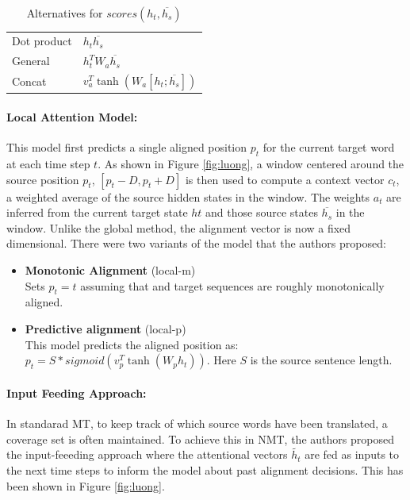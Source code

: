\documentclass{article}
\begin{document}
	 \begin{table}
	 \caption{Alternatives for \(scores(h_t,\overline{h_s})\)}
	  \centering
	  \begin{tabular}{ll}
	  	\toprule
	    Dot product & \(h_t\overline{h_s}\) \\
	    General     & \(h_t^TW_a\overline{h_s}\) \\
	    Concat     & \(v_a^T\tanh(W_a[h_t;\overline{h_s}])\) \\
	    \bottomrule
	  \end{tabular}
	  \label{tab:scores}
	\end{table}

	\paragraph{Local Attention Model: } This model first predicts a single aligned position \(p_t\) for the current target word at each time step \(t\). As shown in Figure \ref{fig:luong}, a window centered around the source position \(p_t\), \([p_t-D, p_t+D]\) is then used to compute a context vector \(c_t\), a weighted average of the source hidden states in the window. The weights \(a_t\) are inferred from the current target state \(ht\) and those source states \(\overline{h_s}\) in the window. Unlike the global method, the alignment vector is now a fixed dimensional. There were two variants of the model that the authors proposed: 
	\begin{itemize}
		\item \textbf{Monotonic Alignment} (local-m)\\Sets \(p_t = t\) assuming that  and target sequences are roughly monotonically aligned.
		\item \textbf{Predictive alignment} (local-p)\\This model predicts the aligned position as: \(p_t = S \ast sigmoid(v_p^T\tanh(W_ph_t))\). Here \(S\) is the source sentence length. 
	\end{itemize}
	
	\paragraph{Input Feeding Approach: } In standarad MT, to keep track of which source words have been translated, a coverage set is often maintained. To achieve this in NMT, the authors proposed the input-feeeding approach where the attentional vectors \(\widetilde{h_t}\) are fed as inputs to the next time steps to inform the model about past alignment decisions. This has been shown in Figure \ref{fig:luong}.
	
\end{document}
